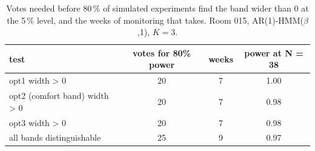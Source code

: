 \begin{table}[ht]
\centering
\begin{tabular}{lccc}
\hline
test & votes for 80\% power & weeks & power at N = 38 \\
\hline
opt1 width > 0 & 20 & 7 & 1.00 \\
opt2 (comfort band) width > 0 & 20 & 7 & 0.98 \\
opt3 width > 0 & 20 & 7 & 0.98 \\
all bands distinguishable & 25 & 9 & 0.97 \\
\hline
\end{tabular}
\caption{Votes needed before 80\,\% of simulated experiments find the band wider than 0 at the 5\,\% level, and the weeks of monitoring that takes. Room 015, AR(1)-HMM($\beta$,1), $K=3$.}
\label{tab:feedback_power_room_015_ar1_hmm_beta_1_K3}
\end{table}
